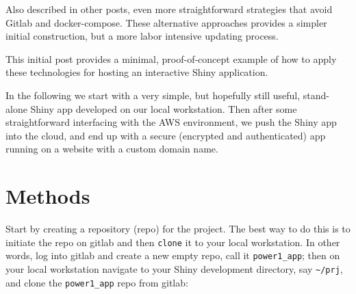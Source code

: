 \documentclass[
  letterpaper,
  DIV=11,
  numbers=noendperiod,
  oneside]{scrartcl}
\begin{document}
Also described in other posts, even more straightforward strategies that
avoid Gitlab and docker-compose. These alternative approaches provides a
simpler initial construction, but a more labor intensive updating
process.

This initial post provides a minimal, proof-of-concept example of how to
apply these technologies for hosting an interactive Shiny application.

In the following we start with a very simple, but hopefully still
useful, stand-alone Shiny app developed on our local workstation. Then
after some straightforward interfacing with the AWS environment, we push
the Shiny app into the cloud, and end up with a secure (encrypted and
authenticated) app running on a website with a custom domain name.

\hypertarget{methods}{%
\section{Methods}\label{methods}}

Start by creating a repository (repo) for the project. The best way to
do this is to initiate the repo on gitlab and then \texttt{clone} it to
your local workstation. In other words, log into gitlab and create a new
empty repo, call it \texttt{power1\_app}; then on your local workstation
navigate to your Shiny development directory, say
\texttt{\textasciitilde{}/prj}, and clone the \texttt{power1\_app} repo
from gitlab:
\end{document}
